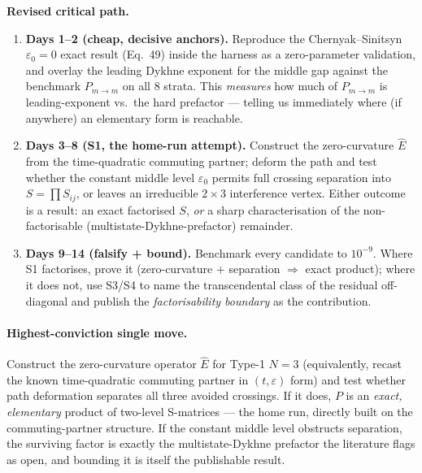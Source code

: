 \documentclass[11pt]{article}
\newcommand{\eps}{\varepsilon}
\newcommand{\Pmid}{P_{m\to m}}
\begin{document}
\noindent\textbf{Revised critical path.}
\begin{enumerate}[nosep,leftmargin=1.4em]
\item \textbf{Days 1--2 (cheap, decisive anchors).} Reproduce the Chernyak--Sinitsyn $\eps_0=0$
  exact result (Eq.~49) inside the harness as a zero-parameter validation, and overlay the leading
  Dykhne exponent for the middle gap against the benchmark $\Pmid$ on all 8 strata. This
  \emph{measures} how much of $\Pmid$ is leading-exponent vs.\ the hard prefactor --- telling us
  immediately where (if anywhere) an elementary form is reachable.
\item \textbf{Days 3--8 (S1, the home-run attempt).} Construct the zero-curvature $\hat E$ from the
  time-quadratic commuting partner; deform the path and test whether the constant middle level
  $\eps_0$ permits full crossing separation into $S=\prod S_{ij}$, or leaves an irreducible
  $2{\times}3$ interference vertex. Either outcome is a result: an exact factorised $S$, \emph{or}
  a sharp characterisation of the non-factorisable (multistate-Dykhne-prefactor) remainder.
\item \textbf{Days 9--14 (falsify + bound).} Benchmark every candidate to $10^{-9}$. Where S1
  factorises, prove it (zero-curvature + separation $\Rightarrow$ exact product); where it does
  not, use S3/S4 to name the transcendental class of the residual off-diagonal and publish the
  \emph{factorisability boundary} as the contribution.
\end{enumerate}

\paragraph{Highest-conviction single move.} Construct the zero-curvature operator $\hat E$ for
Type-1 $N{=}3$ (equivalently, recast the known time-quadratic commuting partner in $(t,\eps)$
form) and test whether path deformation separates all three avoided crossings. If it does, $P$ is
an \emph{exact, elementary} product of two-level S-matrices --- the home run, directly built on the
commuting-partner structure. If the constant middle level obstructs separation, the surviving
factor is exactly the multistate-Dykhne prefactor the literature flags as open, and bounding it is
itself the publishable result.
\end{document}
